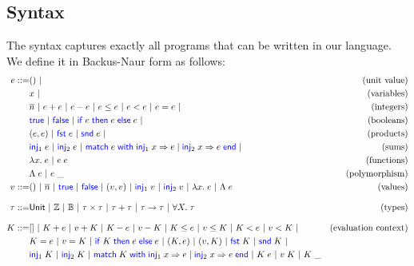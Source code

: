 \documentclass[twoside,11pt,openright]{report}
\theoremstyle{definition}
\newcommand{\BNFdef}{::=}
\newcommand{\ALT}{~|~}
\newcommand{\Keyword}[1]{{\color{blue} \mathsf{#1}}}
\newcommand{\var}{x}
\newcommand{\expr}{e}
\newcommand{\val}{v}
\newcommand{\TT}{()}
\newcommand{\Num}[1]{\overline{#1}}
\newcommand{\True}{\Keyword{true}}
\newcommand{\False}{\Keyword{false}}
\newcommand{\IfCmd}{\Keyword{if}}
\newcommand{\ThenCmd}{\Keyword{then}}
\newcommand{\ElseCmd}{\Keyword{else}}
\def\If#1then#2else#3{\IfCmd{}\;#1\;\ThenCmd{}\;#2\;\ElseCmd{}\;#3}
\newcommand{\Fst}{\Keyword{fst}\;}
\newcommand{\Snd}{\Keyword{snd}\;}
\newcommand{\Inj}[1]{\Keyword{inj}_{#1}\;}
\newcommand{\MatchCmd}{\Keyword{match}}
\newcommand{\WithCmd}{\Keyword{with}}
\newcommand{\EndCmd}{\Keyword{end}}
\def\Match#1with#2=>#3|#4=>#5end{\MatchCmd{}\;#1\;\WithCmd{}\;#2\Rightarrow#3 \;|\;#4\Rightarrow#5\;\EndCmd{}}
\newcommand{\Tvar}{X}
\newcommand{\Tlam}{\Lambda\;}
\newcommand{\Tapp}[1]{#1\;\_}
\newcommand{\empelctx}{[]}
\newcommand{\elctx}{K}
\newcommand{\Tunit}{\mathsf{Unit}}
\newcommand{\Tint}{\mathbb{Z}}
\newcommand{\Tbool}{\mathbb{B}}
\newcommand{\Tprod}[2]{#1 \times #2}
\newcommand{\Tsum}[2]{#1 + #2}
\newcommand{\Tfunc}[2]{#1 \rightarrow #2}
\newcommand{\Tall}[2]{\forall #1.\; #2}
\newcommand{\typ}{\tau}
\begin{document}
\subsection{Syntax}
The syntax captures exactly all programs that can be written in our language. We define it in Backus-Naur form as follows:
\begin{align*}
  \expr \BNFdef & \TT \ALT & \text{(unit value)}\\
                & \var \ALT & \text{(variables)}\\
                & \Num{n} \ALT \expr + \expr \ALT \expr - \expr \ALT
                  \expr \le \expr \ALT \expr < \expr \ALT 
                  \expr = \expr \ALT & \text{(integers)}\\
                & \True \ALT \False \ALT {\If \expr then \expr else \expr} \ALT
                  & \text{(booleans)}\\
                & (\expr, \expr) \ALT \Fst \expr \ALT \Snd \expr \ALT
                  & \text{(products)}\\
                & \Inj{1} \expr \ALT \Inj{2} \expr \ALT 
                  \Match \expr with \Inj{1} \var => \expr | \Inj{2} \var => \expr end \ALT
                  & \text{(sums)}\\
                & \fun \var . \expr \ALT \expr \; \expr
                  & \text{(functions)}\\
                & \Tlam \expr \ALT \Tapp{\expr} & \text{(polymorphism)}\\
  \val \BNFdef  & \TT \ALT \Num{n} \ALT \True \ALT \False \ALT
                  (\val, \val) \ALT \Inj{1} \val \ALT \Inj{2} \val \ALT
                  \fun \var . \expr \ALT \Tlam \expr
                  & \text{(values)}\\[8pt]
  \typ \BNFdef  & \Tunit \ALT \Tint \ALT \Tbool \ALT {\Tprod \typ \typ} \ALT
                  {\Tsum \typ \typ} \ALT {\Tfunc \typ \typ} \ALT 
                  {\Tall \Tvar \typ} & \text{(types)}\\[8pt]
  \elctx \BNFdef& \empelctx \ALT 
                  \elctx + \expr \ALT \val + \elctx \ALT
                  \elctx - \expr \ALT \val - \elctx \ALT
                  \elctx \le \expr \ALT \val \le \elctx \ALT
                  \elctx < \expr \ALT \val < \elctx \ALT 
                  & \text{(evaluation context)}\\
                & \elctx = \expr \ALT \val = \elctx \ALT
                  {\If \elctx then \expr else \expr} \ALT
                  (\elctx, \expr) \ALT (\val, \elctx) \ALT
                  \Fst \elctx \ALT \Snd \elctx \ALT\\
                & \Inj{1} \elctx \ALT \Inj{2} \elctx \ALT
                  \Match \elctx with \Inj{1} \var => \expr | \Inj{2} \var => \expr end \ALT
                  \elctx \; \expr \ALT \val \; \elctx \ALT \Tapp{\elctx}
\end{align*}
\end{document}
